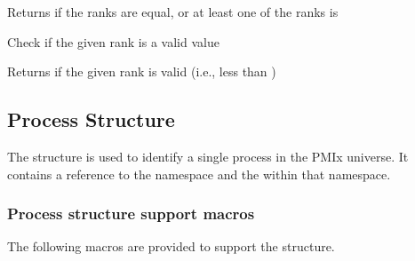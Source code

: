 
\begin{arglist}
\end{arglist}

Returns  if the ranks are equal, or at least one of the ranks is 


Check if the given rank is a valid value


\begin{arglist}
\end{arglist}

Returns  if the given rank is valid (i.e., less than )

\subsection{Process Structure}

The  structure is used to identify a single process in the PMIx universe.
It contains a reference to the namespace and the  within that namespace.


\subsubsection{Process structure support macros}
The following macros are provided to support the  structure.

